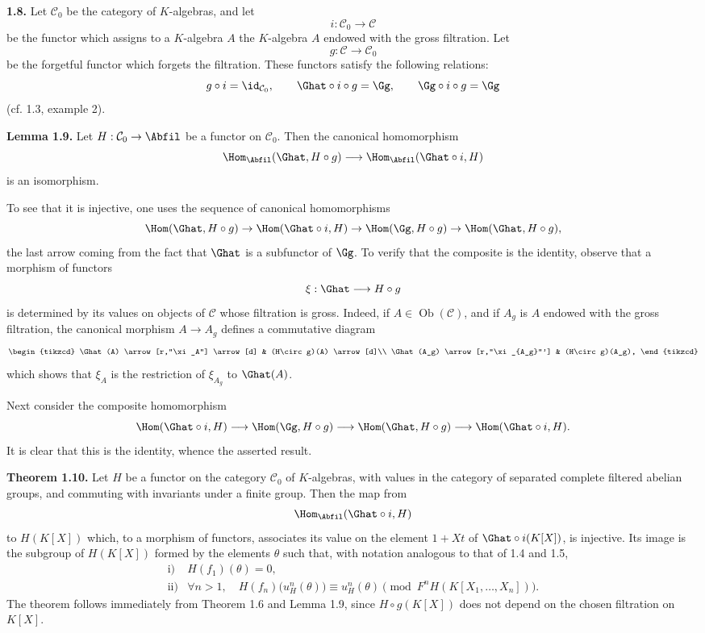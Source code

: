 \textbf{1.8.} Let \(\mathcal C_0\) be the category of \(K\)-algebras, and let
\[
  i:\mathcal C_0\longrightarrow\mathcal C
\]
be the functor which assigns to a \(K\)-algebra \(A\) the \(K\)-algebra \(A\) endowed with the gross filtration. Let
\[
  g:\mathcal C\longrightarrow\mathcal C_0
\]
be the forgetful functor which forgets the filtration. These functors satisfy the following relations:
\[
  g\circ i=\id_{\mathcal C_0},\qquad
  \Ghat\circ i\circ g=\Gg,\qquad
  \Gg\circ i\circ g=\Gg
\]
(cf. 1.3, example 2).

\textbf{Lemma 1.9.} Let \(H:\mathcal C_0\to\Abfil\) be a functor on \(\mathcal C_0\). Then the canonical homomorphism
\[
  \Hom_{\Abfil}(\Ghat,H\circ g)
  \longrightarrow
  \Hom_{\Abfil}(\Ghat\circ i,H)
\]
is an isomorphism.

To see that it is injective, one uses the sequence of canonical homomorphisms
\[
 \Hom(\Ghat,H\circ g)\to
 \Hom(\Ghat\circ i,H)\to
 \Hom(\Gg,H\circ g)\to
 \Hom(\Ghat,H\circ g),
\]
the last arrow coming from the fact that \(\Ghat\) is a subfunctor of \(\Gg\). To verify that the composite is the identity, observe that a morphism of functors
\[
  \xi:\Ghat\longrightarrow H\circ g
\]
is determined by its values on objects of \(\mathcal C\) whose filtration is gross. Indeed, if \(A\in\operatorname{Ob}(\mathcal C)\), and if \(A_g\) is \(A\) endowed with the gross filtration, the canonical morphism \(A\to A_g\) defines a commutative diagram
\[
\begin{tikzcd}
\Ghat(A) \arrow[r,"\xi_A"] \arrow[d] &
(H\circ g)(A) \arrow[d]\\
\Ghat(A_g) \arrow[r,"\xi_{A_g}"'] &
(H\circ g)(A_g),
\end{tikzcd}
\]
which shows that \(\xi_A\) is the restriction of \(\xi_{A_g}\) to \(\Ghat(A)\).

Next consider the composite homomorphism
\[
  \Hom(\Ghat\circ i,H)\longrightarrow
  \Hom(\Gg,H\circ g)\longrightarrow
  \Hom(\Ghat,H\circ g)\longrightarrow
  \Hom(\Ghat\circ i,H).
\]
It is clear that this is the identity, whence the asserted result.

\textbf{Theorem 1.10.} Let \(H\) be a functor on the category \(\mathcal C_0\) of \(K\)-algebras, with values in the category of separated complete filtered abelian groups, and commuting with invariants under a finite group. Then the map from
\[
  \Hom_{\Abfil}(\Ghat\circ i,H)
\]
to \(H(K[X])\) which, to a morphism of functors, associates its value on the element \(1+Xt\) of \(\Ghat\circ i(K[X])\), is injective. Its image is the subgroup of \(H(K[X])\) formed by the elements \(\theta\) such that, with notation analogous to that of 1.4 and 1.5,
\[
\begin{array}{ll}
\text{i)}& H(f_1)(\theta)=0,\\[0.3em]
\text{ii)}& \forall n>1,\quad
 H(f_n)\bigl(u_H^n(\theta)\bigr)\equiv u_H^n(\theta)
 \pmod{F^nH(K[X_1,\ldots,X_n])}.
\end{array}
\]
The theorem follows immediately from Theorem 1.6 and Lemma 1.9, since \(H\circ g(K[X])\) does not depend on the chosen filtration on \(K[X]\).

